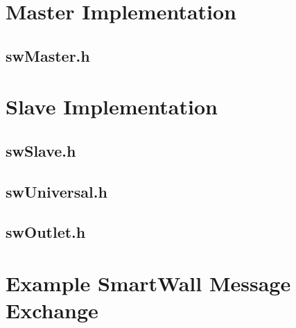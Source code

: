 \documentclass[11pt]{article}
\begin{document}
\pagebreak

\section{Master Implementation}
\label{sec:MasterImplmentation}

\pagebreak

\subsection{swMaster.h}
\label{sec:MasterImplmentation.swMaster.h}


\pagebreak

\section{Slave Implementation}
\label{sec:SlaveImplmentation}

\pagebreak

\subsection{swSlave.h}
\label{sec:SlaveImplmentation.swSlave.h}


\pagebreak

\subsection{swUniversal.h}
\label{sec:SlaveImplmentation.swUniversal.h}


\pagebreak

\subsection{swOutlet.h}
\label{sec:SlaveImplmentation.swOutlet.h}


\pagebreak

\section{Example SmartWall Message Exchange}
\label{sec:MessageExchange}



\pagebreak
\end{document}
